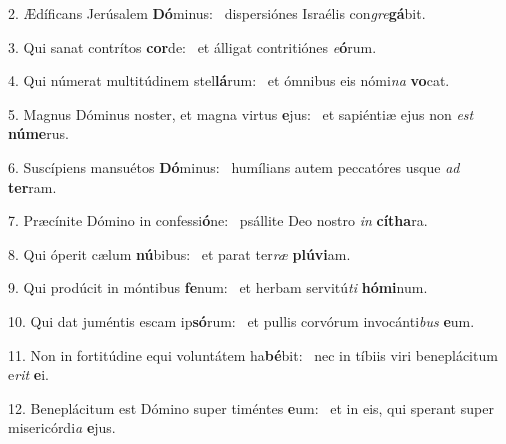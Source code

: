 2. Ædíficans Jerúsalem \textbf{Dó}minus: \ast\  dispersiónes Israélis con\textit{gre}\textbf{gá}bit.\

3. Qui sanat contrítos \textbf{cor}de: \ast\  et álligat contritiónes \textit{e}\textbf{ó}rum.\

4. Qui númerat multitúdinem stel\textbf{lá}rum: \ast\  et ómnibus eis nómi\textit{na} \textbf{vo}cat.\

5. Magnus Dóminus noster, et magna virtus \textbf{e}jus: \ast\  et sapiéntiæ ejus non \textit{est} \textbf{nú}\textbf{me}rus.\

6. Suscípiens mansuétos \textbf{Dó}minus: \ast\  humílians autem peccatóres usque \textit{ad} \textbf{ter}ram.\

7. Præcínite Dómino in confessi\textbf{ó}ne: \ast\  psállite Deo nostro \textit{in} \textbf{cí}\textbf{tha}ra.\

8. Qui óperit cælum \textbf{nú}bibus: \ast\  et parat ter\textit{ræ} \textbf{plú}\textbf{vi}am.\

9. Qui prodúcit in móntibus \textbf{fe}num: \ast\  et herbam servitú\textit{ti} \textbf{hó}\textbf{mi}num.\

10. Qui dat juméntis escam ip\textbf{só}rum: \ast\  et pullis corvórum invocánti\textit{bus} \textbf{e}um.\

11. Non in fortitúdine equi voluntátem ha\textbf{bé}bit: \ast\  nec in tíbiis viri beneplácitum e\textit{rit} \textbf{e}i.\

12. Beneplácitum est Dómino super timéntes \textbf{e}um: \ast\  et in eis, qui sperant super misericórdi\textit{a} \textbf{e}jus.\

